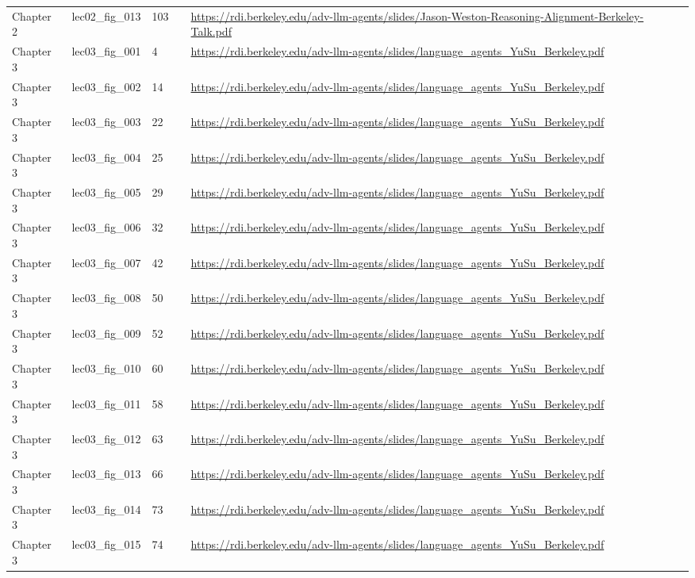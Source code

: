 \begin{longtable}{p{}p{}p{}p{}p{}}
Chapter 2 & lec02\_fig\_013 & 103 &  & \url{https://rdi.berkeley.edu/adv-llm-agents/slides/Jason-Weston-Reasoning-Alignment-Berkeley-Talk.pdf} \\
Chapter 3 & lec03\_fig\_001 & 4 &  & \url{https://rdi.berkeley.edu/adv-llm-agents/slides/language_agents_YuSu_Berkeley.pdf} \\
Chapter 3 & lec03\_fig\_002 & 14 &  & \url{https://rdi.berkeley.edu/adv-llm-agents/slides/language_agents_YuSu_Berkeley.pdf} \\
Chapter 3 & lec03\_fig\_003 & 22 &  & \url{https://rdi.berkeley.edu/adv-llm-agents/slides/language_agents_YuSu_Berkeley.pdf} \\
Chapter 3 & lec03\_fig\_004 & 25 &  & \url{https://rdi.berkeley.edu/adv-llm-agents/slides/language_agents_YuSu_Berkeley.pdf} \\
Chapter 3 & lec03\_fig\_005 & 29 &  & \url{https://rdi.berkeley.edu/adv-llm-agents/slides/language_agents_YuSu_Berkeley.pdf} \\
Chapter 3 & lec03\_fig\_006 & 32 &  & \url{https://rdi.berkeley.edu/adv-llm-agents/slides/language_agents_YuSu_Berkeley.pdf} \\
Chapter 3 & lec03\_fig\_007 & 42 &  & \url{https://rdi.berkeley.edu/adv-llm-agents/slides/language_agents_YuSu_Berkeley.pdf} \\
Chapter 3 & lec03\_fig\_008 & 50 &  & \url{https://rdi.berkeley.edu/adv-llm-agents/slides/language_agents_YuSu_Berkeley.pdf} \\
Chapter 3 & lec03\_fig\_009 & 52 &  & \url{https://rdi.berkeley.edu/adv-llm-agents/slides/language_agents_YuSu_Berkeley.pdf} \\
Chapter 3 & lec03\_fig\_010 & 60 &  & \url{https://rdi.berkeley.edu/adv-llm-agents/slides/language_agents_YuSu_Berkeley.pdf} \\
Chapter 3 & lec03\_fig\_011 & 58 &  & \url{https://rdi.berkeley.edu/adv-llm-agents/slides/language_agents_YuSu_Berkeley.pdf} \\
Chapter 3 & lec03\_fig\_012 & 63 &  & \url{https://rdi.berkeley.edu/adv-llm-agents/slides/language_agents_YuSu_Berkeley.pdf} \\
Chapter 3 & lec03\_fig\_013 & 66 &  & \url{https://rdi.berkeley.edu/adv-llm-agents/slides/language_agents_YuSu_Berkeley.pdf} \\
Chapter 3 & lec03\_fig\_014 & 73 &  & \url{https://rdi.berkeley.edu/adv-llm-agents/slides/language_agents_YuSu_Berkeley.pdf} \\
Chapter 3 & lec03\_fig\_015 & 74 &  & \url{https://rdi.berkeley.edu/adv-llm-agents/slides/language_agents_YuSu_Berkeley.pdf} \\

\end{longtable}
